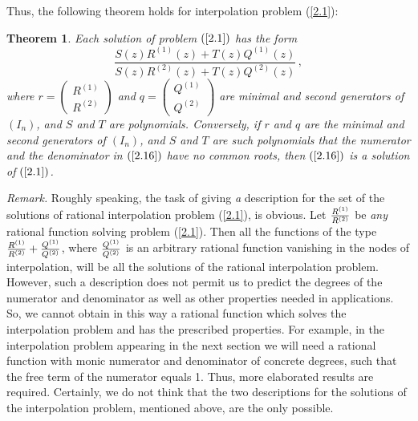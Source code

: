 \documentclass{amsart}
\newtheorem{theorem}{Theorem}[section]
\begin{document}
\medskip

Thus, the following theorem holds for interpolation problem
(\ref{2.1}):

\begin{theorem}\label{theor2.9}
Each solution of problem $(\ref{2.1})$ has the form
\begin{equation} \label{2.16}
\frac{ S(z) R^{(1)}(z) + T(z) Q^{(1)}(z)}{S(z) R^{(2)}(z) + T(z)
Q^{(2)}(z)}\,,
\end{equation}
where $r=\begin{pmatrix} R^{(1)} \\ R^{(2)}
\end{pmatrix}$ and $q=\begin{pmatrix} Q^{(1)} \\ Q^{(2)}
\end{pmatrix}$ are minimal and second generators of $(I_n)$,
and $S$ and $T$ are polynomials. Conversely, if $r$ and $q$ are the
minimal and  second generators of $(I_n)$, and $S$ and $T$ are such
polynomials that the numerator and the denominator in $(\ref{2.16})$
have no common roots, then $(\ref{2.16})$ is a solution of
$(\ref{2.1})$.
\end{theorem}

\bigskip

{\it Remark.} Roughly speaking, the task of giving {\it a}
description for the set of the solutions of rational interpolation
problem (\ref{2.1}), is obvious. Let
${{\displaystyle}\frac{R^{(1)}}{R^{(2)}}}$ be {\it any} rational function
solving problem (\ref{2.1}). Then all the functions of the type
${{\displaystyle}\frac{R^{(1)}}{R^{(2)}} + \frac{Q^{(1)}}{Q^{(2)}}}$, where
${{\displaystyle}\frac{Q^{(1)}}{Q^{(2)}}}$ is an arbitrary rational function
vanishing in the nodes of interpolation, will be all the solutions
of the rational interpolation problem. However, such a description
does not permit us to predict the degrees of the numerator and
denominator as well as other properties needed in applications.
So, we cannot obtain in this way a rational function which solves
the interpolation problem and has the prescribed properties. For
example, in the interpolation problem appearing in the next
section we will need a rational function with monic numerator and
denominator of concrete degrees, such that the free term of the
numerator equals 1. Thus, more elaborated results are required.
Certainly, we do not think that the two descriptions for the
solutions of the interpolation problem, mentioned above, are the
only possible.
\end{document}
